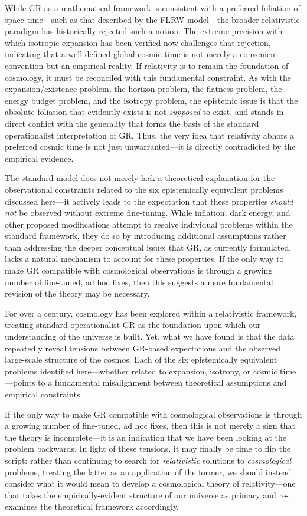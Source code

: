 \documentclass[aps,prd,reprint,superscriptaddress]{revtex4-2}
\begin{document}
While GR as a mathematical framework is consistent with a preferred foliation of space-time---such as that described by the FLRW model---the broader relativistic paradigm has historically rejected such a notion. The extreme precision with which isotropic expansion has been verified now challenges that rejection, indicating that a well-defined global cosmic time is not merely a convenient convention but an empirical reality. If relativity is to remain the foundation of cosmology, it must be reconciled with this fundamental constraint. As with the expansion/existence problem, the horizon problem, the flatness problem, the energy budget problem, and the isotropy problem, the epistemic issue is that the absolute foliation that evidently exists is not \textit{supposed} to exist, and stands in direct conflict with the generality that forms the basis of the standard operationalist interpretation of GR. Thus, the very idea that relativity abhors a preferred cosmic time is not just unwarranted---it is directly contradicted by the empirical evidence.

The standard model does not merely lack a theoretical explanation for the observational constraints related to the six epistemically equivalent problems discussed here---it actively leads to the expectation that these properties \textit{should not} be observed without extreme fine-tuning. While inflation, dark energy, and other proposed modifications attempt to resolve individual problems within the standard framework, they do so by introducing additional assumptions rather than addressing the deeper conceptual issue: that GR, as currently formulated, lacks a natural mechanism to account for these properties. If the only way to make GR compatible with cosmological observations is through a growing number of fine-tuned, ad hoc fixes, then this suggests a more fundamental revision of the theory may be necessary.

For over a century, cosmology has been explored within a relativistic framework, treating standard operationalist GR as the foundation upon which our understanding of the universe is built. Yet, what we have found is that the data repeatedly reveal tensions between GR-based expectations and the observed large-scale structure of the cosmos. Each of the six epistemically equivalent problems identified here---whether related to expansion, isotropy, or cosmic time---points to a fundamental misalignment between theoretical assumptions and empirical constraints.

If the only way to make GR compatible with cosmological observations is through a growing number of fine-tuned, ad hoc fixes, then this is not merely a sign that the theory is incomplete---it is an indication that we have been looking at the problem backwards. In light of these tensions, it may finally be time to flip the script: rather than continuing to search for \textit{relativistic} solutions to \textit{cosmological} problems, treating the latter as an application of the former, we should instead consider what it would mean to develop a cosmological theory of relativity---one that takes the empirically-evident structure of our universe as primary and re-examines the theoretical framework accordingly.
\end{document}
